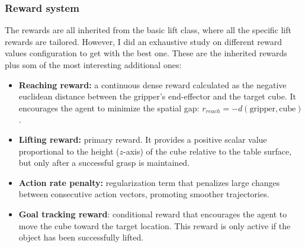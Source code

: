 \subsubsection{Reward system}
The rewards are all inherited from the basic lift class, where all the specific lift rewards are tailored. However, I did an exhaustive study on different reward values configuration to get with the best one. These are the inherited rewards plus som of the most interesting additional ones:

\begin{itemize}
	\item \textbf{Reaching reward:} a continuous dense reward calculated as the negative euclidean distance between the gripper's end-effector and the target cube. It encourages the agent to minimize the spatial gap: $r_{reach} = -d(\text{gripper}, \text{cube})$.
	
	
	\item \textbf{Lifting reward:} primary reward. It provides a positive scalar value proportional to the height ($z$-axis) of the cube relative to the table surface, but only after a successful grasp is maintained.
	
	\item \textbf{Action rate penalty:} regularization term that penalizes large changes between consecutive action vectors, promoting smoother trajectories.
	
	\item \textbf{Goal tracking reward}: conditional reward that encourages the agent to move the cube toward the target location. This reward is only active if the object has been successfully lifted.
	
	
\end{itemize}

